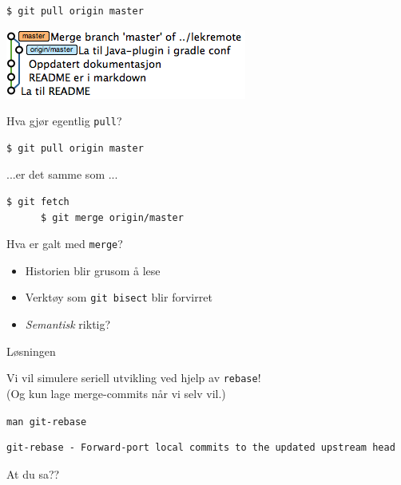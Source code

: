 \documentclass{beamer}
\begin{document}
\begin{frame}[fragile]{}
    \begin{lstlisting}[language=bash]
      $ git pull origin master
    \end{lstlisting}
    \medskip
    \pause
    \includegraphics[scale=0.7]{2.png}
\end{frame}

\begin{frame}[fragile]{Hva gjør egentlig \texttt{pull}?}
    \begin{lstlisting}[language=bash]
      $ git pull origin master
    \end{lstlisting}
    \medskip
    ...er det samme som ...
    \medskip
    \begin{lstlisting}[language=bash]
      $ git fetch
      $ git merge origin/master
    \end{lstlisting}
\end{frame}


\begin{frame}{Hva er galt med \texttt{merge}?}
    \begin{itemize}
        \item<1-1> Historien blir grusom å lese
        \item<2-2> Verktøy som \texttt{git bisect} blir forvirret
        \item<3-3> \emph{Semantisk} riktig?
    \end{itemize}
\end{frame}

\begin{frame}{Løsningen}
    \begin{center}
        Vi vil simulere seriell utvikling ved hjelp av \texttt{rebase}!\\
        \medskip
        \pause
        (Og kun lage merge-commits når vi selv vil.)
    \end{center}
\end{frame}

\begin{frame}[fragile]{\texttt{man git-rebase}}
    \begin{lstlisting}[]
git-rebase - Forward-port local commits to the updated upstream head
    \end{lstlisting}
    \medskip
    \pause
    At du sa??
\end{frame}
\end{document}
